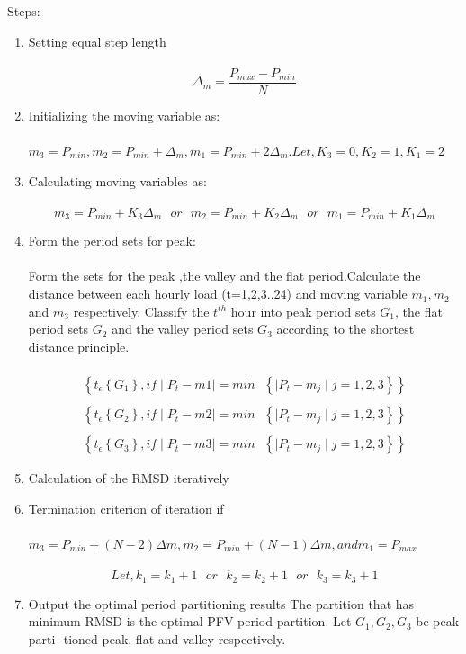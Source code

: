 \documentclass[12pt]{article}
\begin{document}
\pagebreak
Steps:\\
\begin{enumerate}
\item Setting equal step length\\\\
$$\Delta_{m} = \frac{P_{max}-P_{min}}{N}$$
\item Initializing the moving variable as:\\\\
$m_{3}=P_{min},m_{2}=P_{min}+\Delta_{m},m_{1}=P_{min}+2\Delta_{m}.Let, K_{3}=0,K_{2}=1,K_{1}=2$
\item Calculating moving variables as:\\\\
$$m_{3}=P_{min}+K_{3}\Delta_{m}\,\,\,\,or\,\,\,\,m_{2}=P_{min}+K_{2}\Delta_{m}\,\,\,\,or\,\,\,\,m_{1}=P_{min}+K_{1}\Delta_{m}$$
\item Form the period sets for peak:\\\\
Form the sets for the peak ,the valley and the flat period.Calculate the distance between each hourly load (t=1,2,3..24) and moving variable $m_{1}, m_{2}$ and $m_{3}$ respectively. Classify the $t^{th}$ hour into peak period sets $G_{1}$,  the
flat period sets $G_{2}$ and the valley period sets $G_{3}$ according to the shortest
distance principle.\\\\
\begin{eqnarray*}
\left\lbrace t_{\epsilon} \left\lbrace G_{1}\right\rbrace , if  \mid P_{t}-m{1} \mid = min\,\,\,\, \left\lbrace   \mid P_{t}-m_{j} \mid j = 1,2,3\right\rbrace \right\rbrace\\\\
\left\lbrace t_{\epsilon} \left\lbrace G_{2}\right\rbrace , if  \mid P_{t}-m{2} \mid = min\,\,\,\, \left\lbrace   \mid P_{t}-m_{j} \mid j = 1,2,3\right\rbrace \right\rbrace\\\\
\left\lbrace t_{\epsilon} \left\lbrace G_{3}\right\rbrace , if  \mid P_{t}-m{3} \mid = min\,\,\,\, \left\lbrace   \mid P_{t}-m_{j} \mid j = 1,2,3\right\rbrace \right\rbrace
\end{eqnarray*}
\item Calculation of the RMSD iteratively\\
\item  Termination criterion of iteration if\\\\
$m_{3} = P_{min} + (N-2)\Delta m,  m_{2} = P_{min} + (N-1)\Delta m,  and m_{1} = P_{max}$\\\\
$$Let, k_{1} = k_{1}+ 1 \,\,\,\, or \,\,\,\, k_{2} = k_{2}+ 1\,\,\,\, or \,\,\,\, k_{3} = k_{3}+ 1$$
\smallskip
\item Output the optimal period partitioning results The partition that has minimum RMSD is the optimal PFV period partition. Let $ G_{1}, G_{2}, G_{3} $ be peak parti-
tioned peak, flat and  valley respectively. \\
\end{enumerate}
\end{document}
